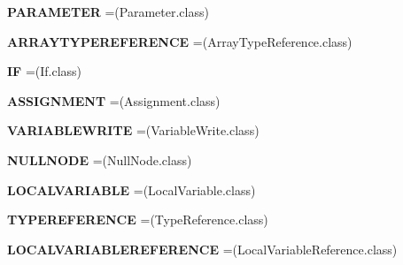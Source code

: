 \begin{DoxyCompactItemize}
\item 
{\bfseries P\+A\+R\+A\+M\+E\+T\+ER} =(Parameter.\+class)\hypertarget{enumparser_1_1_class_selector_a7c251872d8f034ab33e6475c1ae4b13d}{}\label{enumparser_1_1_class_selector_a7c251872d8f034ab33e6475c1ae4b13d}

\item 
{\bfseries A\+R\+R\+A\+Y\+T\+Y\+P\+E\+R\+E\+F\+E\+R\+E\+N\+CE} =(Array\+Type\+Reference.\+class)\hypertarget{enumparser_1_1_class_selector_aed56ee0cee57e86cacb511d15b6a30d0}{}\label{enumparser_1_1_class_selector_aed56ee0cee57e86cacb511d15b6a30d0}

\item 
{\bfseries IF} =(If.\+class)\hypertarget{enumparser_1_1_class_selector_a3ea19d4d3c4e4212cacc60f09acd9efc}{}\label{enumparser_1_1_class_selector_a3ea19d4d3c4e4212cacc60f09acd9efc}

\item 
{\bfseries A\+S\+S\+I\+G\+N\+M\+E\+NT} =(Assignment.\+class)\hypertarget{enumparser_1_1_class_selector_a005caee5654455dd352b7c7b3a57fa93}{}\label{enumparser_1_1_class_selector_a005caee5654455dd352b7c7b3a57fa93}

\item 
{\bfseries V\+A\+R\+I\+A\+B\+L\+E\+W\+R\+I\+TE} =(Variable\+Write.\+class)\hypertarget{enumparser_1_1_class_selector_a882e2f53e6f4a15eaa9066112f99c79c}{}\label{enumparser_1_1_class_selector_a882e2f53e6f4a15eaa9066112f99c79c}

\item 
{\bfseries N\+U\+L\+L\+N\+O\+DE} =(Null\+Node.\+class)\hypertarget{enumparser_1_1_class_selector_a69d9beff151e8e9ac6253e50be3c6e23}{}\label{enumparser_1_1_class_selector_a69d9beff151e8e9ac6253e50be3c6e23}

\item 
{\bfseries L\+O\+C\+A\+L\+V\+A\+R\+I\+A\+B\+LE} =(Local\+Variable.\+class)\hypertarget{enumparser_1_1_class_selector_ab3d0b94b87dc27ca636e244a3d445a32}{}\label{enumparser_1_1_class_selector_ab3d0b94b87dc27ca636e244a3d445a32}

\item 
{\bfseries T\+Y\+P\+E\+R\+E\+F\+E\+R\+E\+N\+CE} =(Type\+Reference.\+class)\hypertarget{enumparser_1_1_class_selector_a29620adae0fd3a208ddd156413d72cd3}{}\label{enumparser_1_1_class_selector_a29620adae0fd3a208ddd156413d72cd3}

\item 
{\bfseries L\+O\+C\+A\+L\+V\+A\+R\+I\+A\+B\+L\+E\+R\+E\+F\+E\+R\+E\+N\+CE} =(Local\+Variable\+Reference.\+class)\hypertarget{enumparser_1_1_class_selector_aa84d848a300f2d2b29f2c9d2eb061b01}{}\label{enumparser_1_1_class_selector_aa84d848a300f2d2b29f2c9d2eb061b01}


\end{DoxyCompactItemize}
